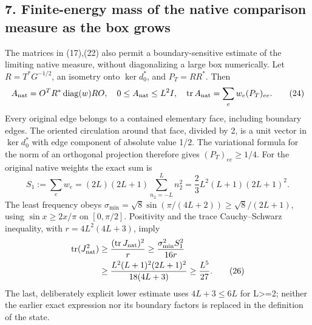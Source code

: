 \documentclass[
  11pt,
]{article}
\begin{document}
\subsection{7. Finite-energy mass of the native comparison measure as
the box
grows}\label{weak-coupling-part-3-finite-energy-mass-of-the-native-comparison-measure-as-the-box-grows}

The matrices in (17),(22) also permit a boundary-sensitive estimate of
the limiting native measure, without diagonalizing a large box
numerically. Let \(R=T^*G^{-1/2}\), an isometry onto \(\ker d_0^*\), and
\(P_T=RR^*\). Then \[
 A_{\rm nat}=O^TR^*\operatorname{diag}(w)RO,\quad
 0\le A_{\rm nat}\le L^2I,\quad
 \operatorname{tr}A_{\rm nat}=\sum_e w_e(P_T)_{ee}.         \tag{24}
\] Every original edge belongs to a contained elementary face, including
boundary edges. The oriented circulation around that face, divided by 2,
is a unit vector in \(\ker d_0^*\) with edge component of absolute value
1/2. The variational formula for the norm of an orthogonal projection
therefore gives \((P_T)_{ee}\ge1/4\). For the original native weights
the exact sum is \[
 S_1:=\sum_e w_e
   =(2L)(2L+1)\sum_{n_2=-L}^L n_2^2
   =\frac23L^2(L+1)(2L+1)^2.                               \tag{25}
\] The least frequency obeys \(\sigma_{\min}=\sqrt8\sin(\pi/(4L+2))
\ge\sqrt8/(2L+1)\), using \(\sin x\ge2x/\pi\) on \([0,\pi/2]\).
Positivity and the trace Cauchy--Schwarz inequality, with
\(r=4L^2(4L+3)\), imply \[
 \begin{split}
 \operatorname{tr}(J_{\rm nat}^2)
 &\ge\frac{(\operatorname{tr}J_{\rm nat})^2}{r}
 \ge\frac{\sigma_{\min}^2 S_1^2}{16r}\\
 &\ge\frac{L^2(L+1)^2(2L+1)^2}{18(4L+3)}
 \ge\frac{L^5}{27}.                                      \tag{26}
 \end{split}
\] The last, deliberately explicit lower estimate uses \(4L+3\le6L\) for
L\textgreater=2; neither the earlier exact expression nor its boundary
factors is replaced in the definition of the state.
\end{document}
